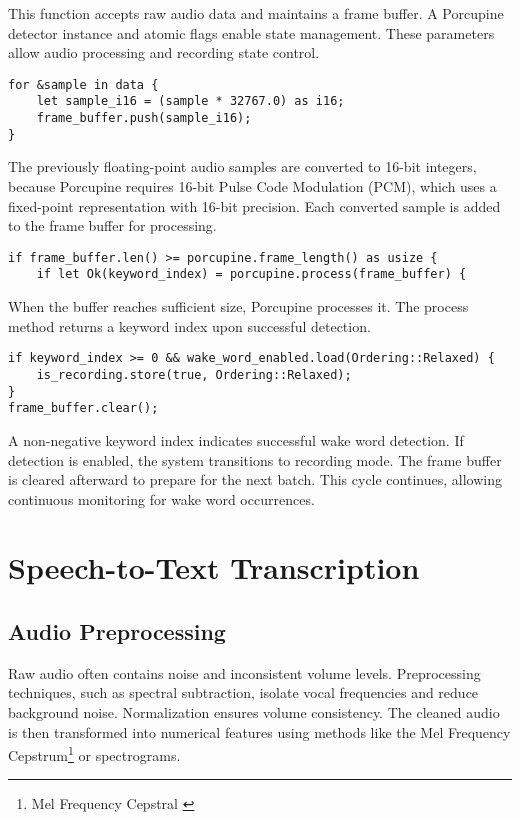 This function accepts raw audio data and maintains a frame buffer.
A Porcupine detector instance and atomic flags enable state management.
These parameters allow audio processing and recording state control.

\begin{verbatim}
for &sample in data {
    let sample_i16 = (sample * 32767.0) as i16;
    frame_buffer.push(sample_i16);
}
\end{verbatim}

The previously floating-point audio samples are converted to 16-bit integers,
because Porcupine requires 16-bit Pulse Code Modulation (PCM),
which uses a fixed-point representation with 16-bit precision.
Each converted sample is added to the frame buffer for processing.

\begin{verbatim}
if frame_buffer.len() >= porcupine.frame_length() as usize {
    if let Ok(keyword_index) = porcupine.process(frame_buffer) {
\end{verbatim}

When the buffer reaches sufficient size, Porcupine processes it.
The process method returns a keyword index upon successful detection.

\begin{verbatim}
if keyword_index >= 0 && wake_word_enabled.load(Ordering::Relaxed) {
    is_recording.store(true, Ordering::Relaxed);
}
frame_buffer.clear();
\end{verbatim}

A non-negative keyword index indicates successful wake word detection.
If detection is enabled, the system transitions to recording mode.
The frame buffer is cleared afterward to prepare for the next batch.
This cycle continues, allowing continuous monitoring for wake word occurrences.

\section{Speech-to-Text Transcription}

\subsection{Audio Preprocessing}
Raw audio often contains noise and inconsistent volume levels.
Preprocessing techniques, such as spectral subtraction, isolate vocal frequencies and reduce background noise.
Normalization ensures volume consistency.
The cleaned audio is then transformed into numerical features
using methods like the Mel Frequency Cepstrum\footnote{Mel Frequency Cepstral \cite{mfc}} or spectrograms.

